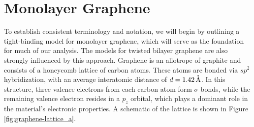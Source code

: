 \section{Monolayer Graphene} \label{sec:monolayer_graphene}

To establish consistent terminology and notation, we will begin by outlining a tight-binding model for monolayer graphene, which will serve as the foundation for much of our analysis. The models for twisted bilayer graphene are also strongly influenced by this approach. Graphene is an allotrope of graphite and consists of a honeycomb lattice of carbon atoms. These atoms are bonded via $sp^2$ hybridization, with an average interatomic distance of \( d = 1.42 \, \AA \). In this structure, three valence electrons from each carbon atom form $\sigma$ bonds, while the remaining valence electron resides in a $p_z$ orbital, which plays a dominant role in the material's electronic properties. A schematic of the lattice is shown in Figure \ref{fig:graphene-lattice_a}.


